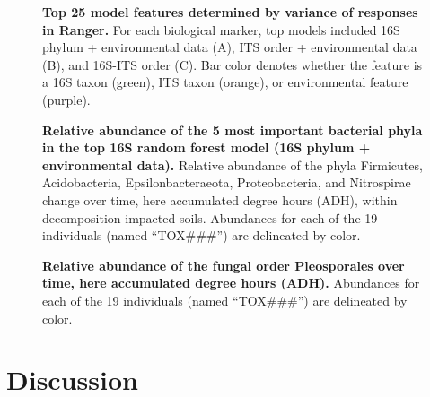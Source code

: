 \documentclass[
  10pt,
  letterpaper,
]{article}
\begin{document}
\begin{figure}[!h]
\caption{{\bf Top 25 model features determined by variance of responses in Ranger.}
For each biological marker, top models included 16S phylum + environmental data (A), ITS order + environmental data (B), and 16S-ITS order (C). Bar color denotes whether the feature is a 16S taxon (green), ITS taxon (orange), or environmental feature (purple).}
\label{fig5}
\end{figure}

\begin{figure}[!h]
\caption{{\bf Relative abundance of the 5 most important bacterial phyla in the top 16S random forest model (16S phylum + environmental data).}
Relative abundance of the phyla Firmicutes, Acidobacteria, Epsilonbacteraeota, Proteobacteria, and Nitrospirae change over time, here accumulated degree hours (ADH), within decomposition-impacted soils. Abundances for each of the 19 individuals (named “TOX\#\#\#”) are delineated by color.}
\label{fig6}
\end{figure}

\begin{figure}[!h]
\caption{{\bf Relative abundance of the fungal order Pleosporales over time, here accumulated degree hours (ADH).}
Abundances for each of the 19 individuals (named “TOX\#\#\#”) are delineated by color.}
\label{fig7}
\end{figure}

\section{Discussion}\label{discussion}
\end{document}
